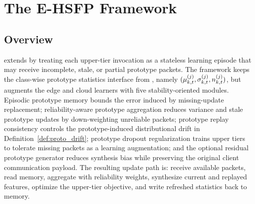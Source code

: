 \section{The E-HSFP Framework}
\label{sec:method}

\subsection{Overview}
\ehsfp extends \hsfp by treating each upper-tier invocation as a stateless learning episode that may receive incomplete, stale, or partial prototype packets. The framework keeps the class-wise prototype statistics interface from \hsfp, namely $(\mu_{k,t}^{(j)},\sigma_{k,t}^{(j)},n_{k,t}^{(j)})$, but augments the edge and cloud learners with five stability-oriented modules. Episodic prototype memory bounds the error induced by missing-update replacement; reliability-aware prototype aggregation reduces variance and stale prototype updates by down-weighting unreliable packets; prototype replay consistency controls the prototype-induced distributional drift in Definition~\ref{def:proto_drift}; prototype dropout regularization trains upper tiers to tolerate missing packets as a learning augmentation; and the optional residual prototype generator reduces synthesis bias while preserving the original client communication payload. The resulting update path is: receive available packets, read memory, aggregate with reliability weights, synthesize current and replayed features, optimize the upper-tier objective, and write refreshed statistics back to memory.

